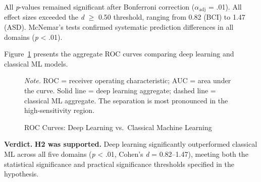 All \textit{p}-values remained significant after Bonferroni correction ($\alpha_{\text{adj}}$ = .01). All effect sizes exceeded the \textit{d} $\geq$ 0.50 threshold, ranging from 0.82 (BCI) to 1.47 (ASD). McNemar's tests confirmed systematic prediction differences in all domains (\textit{p} < .01).

Figure~\ref{fig:ch5_roc_curves} presents the aggregate ROC curves comparing deep learning and classical ML models.

\begin{figure}[H]
    \caption{ROC Curves: Deep Learning vs.\ Classical Machine Learning}
    \label{fig:ch5_roc_curves}
    \vspace{0.5em}\noindent\textit{Note.} ROC = receiver operating characteristic; AUC = area under the curve. Solid line = deep learning aggregate; dashed line = classical ML aggregate. The separation is most pronounced in the high-sensitivity region.
\end{figure}

\textbf{Verdict.} \textbf{H2 was supported.} Deep learning significantly outperformed classical ML across all five domains (\textit{p} < .01, Cohen's \textit{d} = 0.82--1.47), meeting both the statistical significance and practical significance thresholds specified in the hypothesis.

